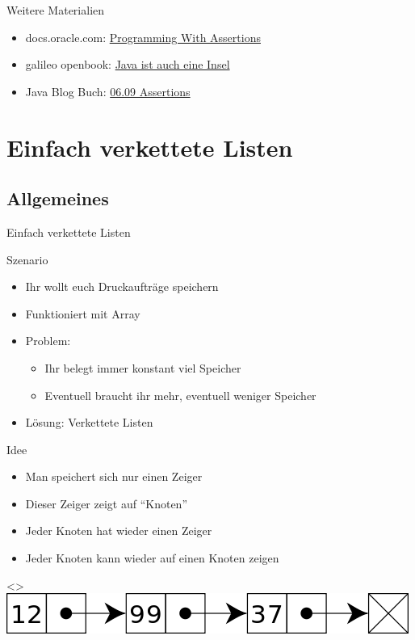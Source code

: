\documentclass[usepdftitle=false,hyperref={pdfpagelabels=false}]{beamer}
\begin{document}
\begin{frame}{Weitere Materialien}
    \begin{itemize}
        \item docs.oracle.com: \href{http://docs.oracle.com/javase/1.4.2/docs/guide/lang/assert.html}{Programming With Assertions}
        \item galileo openbook: \href{http://openbook.galileodesign.de/javainsel5/javainsel07_005.htm}{Java ist auch eine Insel}
        \item Java Blog Buch: \href{http://www.java-blog-buch.de/0609-assertions/}{06.09 Assertions}
    \end{itemize}
\end{frame}

\section{Einfach verkettete Listen}
\subsection{Allgemeines}
\begin{frame}{Einfach verkettete Listen}
    \begin{block}{Szenario}
      \begin{itemize}[<+->]
        \item Ihr wollt euch Druckaufträge speichern
        \item Funktioniert mit Array
        \item Problem:
          \begin{itemize}
            \item Ihr belegt immer konstant viel Speicher
            \item Eventuell braucht ihr mehr, eventuell weniger Speicher
          \end{itemize}
        \item Lösung: Verkettete Listen
      \end{itemize}
    \end{block}
\end{frame}

\begin{frame}{Idee}
    \begin{itemize}[<+->]
        \item Man speichert sich nur einen Zeiger
        \item Dieser Zeiger zeigt auf "`Knoten"'
        \item Jeder Knoten hat wieder einen Zeiger
        \item Jeder Knoten kann wieder auf einen Knoten zeigen
    \end{itemize}
    \only<\thebeamerpauses>{
        \includegraphics[width=\linewidth]{Singly-linked-list.png}
    }
\end{frame}
\end{document}

